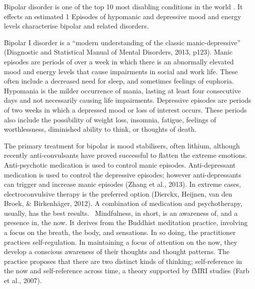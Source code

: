 Bipolar disorder is one of the top 10 most disabling conditions in the world \cite{kupfer_increasing_2005}. It effects an estimated 1%
Episodes of hypomanic and depressive mood and energy levels characterise bipolar and related disorders. 

Bipolar I disorder is a “modern understanding of the classic manic-depressive” (Diagnostic and Statistical Manual of Mental Disorders, 2013, p123). Manic episodes are periods of over a week in which there is an abnormally elevated mood and energy levels that cause impairments in social and work life. These often include a decreased need for sleep, and sometimes feelings of euphoria. Hypomania is the milder occurrence of mania, lasting at least four consecutive days and not necessarily causing life impairments. Depressive episodes are periods of two weeks in which a depressed mood or loss of interest occurs. These periods also include the possibility of weight loss, insomnia, fatigue, feelings of worthlessness, diminished ability to think, or thoughts of death.



The primary treatment for bipolar is mood stabilisers, often lithium, although recently anti-convulsants have proved successful to flatten the extreme emotions. Anti-psychotic medication is used to control manic episodes. Anti-depressant medication is used to control the depressive episodes; however anti-depressants can trigger and increase manic episodes (Zhang et al., 2013). In extreme cases, electroconvulsive therapy is the preferred option (Dierckx, Heijnen, van den Broek, & Birkenhäger, 2012). A combination of medication and psychotherapy, usually, has the best results. 
Mindfulness, in short, is an awareness of, and a presence in, the now. It derives from the Buddhist meditation practice, involving a focus on the breath, the body, and sensations. In so doing, the practitioner practices self-regulation. In maintaining a focus of attention on the now, they develop a conscious awareness of their thoughts and thought patterns. The practice proposes that there are two distinct kinds of thinking; self-reference in the now and self-reference across time, a theory supported by fMRI studies (Farb et al., 2007). 

